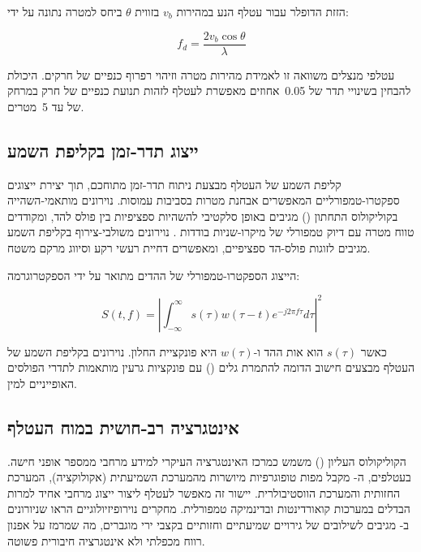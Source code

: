 הזזת הדופלר עבור עטלף הנע במהירות $v_b$ בזווית $\theta$ ביחס למטרה נתונה על ידי:

\begin{equation}
f_d = \frac{2 v_b \cos \theta}{\lambda}
\label{eq:ch02_doppler_bat}
\end{equation}

עטלפי  מנצלים משוואה זו לאמידת מהירות מטרה וזיהוי רפרוף כנפיים של חרקים. היכולת להבחין בשינויי תדר של 0.05~אחוזים מאפשרת לעטלף לזהות תנועת כנפיים של חרק במרחק של עד 5~מטרים.

\subsection{ייצוג תדר-זמן בקליפת השמע}
\label{sec:time_freq}

קליפת השמע של העטלף מבצעת ניתוח תדר-זמן מתוחכם, תוך יצירת ייצוגים ספקטרו-טמפורליים המאפשרים אבחנת מטרות בסביבות עמוסות. נוירונים מותאמי-השהייה בקוליקולוס התחתון () מגיבים באופן סלקטיבי להשהיות ספציפיות בין פולס להד, ומקודדים טווח מטרה עם דיוק טמפורלי של מיקרו-שניות בודדות \cite{MossEcholocation}. נוירונים משולבי-צירוף בקליפת השמע מגיבים לזוגות פולס-הד ספציפיים, ומאפשרים דחיית רעשי רקע וסיווג מרקם משטח.

הייצוג הספקטרו-טמפורלי של ההדים מתואר על ידי הספקטרוגרמה:

\begin{equation}
S(t, f) = \left| \int_{-\infty}^{\infty} s(\tau) w(\tau - t) e^{-j2\pi f \tau} d\tau \right|^2
\label{eq:ch02_spectrogram}
\end{equation}

כאשר $s(\tau)$ הוא אות ההד ו-$w(\tau)$ היא פונקציית החלון. נוירונים בקליפת השמע של העטלף מבצעים חישוב הדומה להתמרת גלים () עם פונקציות גרעין מותאמות לתדרי הפולסים האופייניים למין.

\subsection{אינטגרציה רב-חושית במוח העטלף}
\label{sec:multi_sensory}

הקוליקולוס העליון () משמש כמרכז האינטגרציה העיקרי למידע מרחבי ממספר אופני חישה. בעטלפים, ה- מקבל מפות טופוגרפיות מיושרות מהמערכת השמיעתית (אקולוקציה), המערכת החזותית והמערכת הווסטיבולרית. יישור זה מאפשר לעטלף ליצור ייצוג מרחבי אחיד למרות הבדלים במערכות קואורדינטות ובדינמיקה טמפורלית. מחקרים נוירופיזיולוגיים הראו שניורונים ב- מגיבים לשילובים של גירויים שמיעתיים וחזותיים בקצבי ירי מוגברים, מה שמרמז על אפנון רווח מכפלתי ולא אינטגרציה חיבורית פשוטה.


